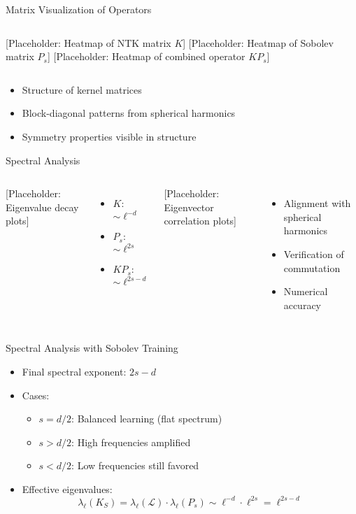 
\begin{frame}{Matrix Visualization of Operators}
    \begin{columns}
    [Placeholder: Heatmap of NTK matrix $K$]
    [Placeholder: Heatmap of Sobolev matrix $P_s$]
    [Placeholder: Heatmap of combined operator $KP_s$]
    \end{columns}
    \begin{itemize}
    \item Structure of kernel matrices
    \item Block-diagonal patterns from spherical harmonics
    \item Symmetry properties visible in structure
    \end{itemize}
    \end{frame}
    
    \begin{frame}{Spectral Analysis}
    \begin{columns}
    [Placeholder: Eigenvalue decay plots]
    \begin{itemize}
    \item $K$: $\sim \ell^{-d}$
    \item $P_s$: $\sim \ell^{2s}$
    \item $KP_s$: $\sim \ell^{2s-d}$
    \end{itemize}
    [Placeholder: Eigenvector correlation plots]
    \begin{itemize}
    \item Alignment with spherical harmonics
    \item Verification of commutation
    \item Numerical accuracy
    \end{itemize}
    \end{columns}
    \end{frame}


    
\begin{frame}{Spectral Analysis with Sobolev Training}
    \begin{itemize}
    \item Final spectral exponent: $2s-d$
    \item Cases:
    \begin{itemize}
    \item $s = d/2$: Balanced learning (flat spectrum)
    \item $s > d/2$: High frequencies amplified
    \item $s < d/2$: Low frequencies still favored
    \end{itemize}
    \item Effective eigenvalues:
    \[ \lambda_\ell(K_S) = \lambda_\ell(\mathcal{L}) \cdot \lambda_\ell(P_s) \sim \ell^{-d} \cdot \ell^{2s} = \ell^{2s-d} \]
    \end{itemize}
    \end{frame}

